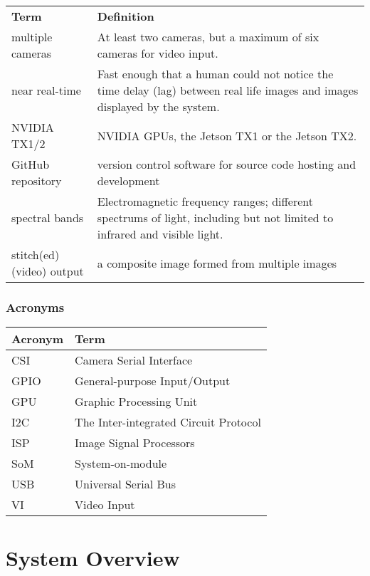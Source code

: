\documentclass[letterpaper,10pt,serif,draftclsnofoot,onecolumn,compsoc,titlepage]{IEEEtran}
\begin{document}
\begin{tabular}{|l|p{11cm}|}
	\hline
	\textbf{Term} & \textbf{Definition}\\
	multiple cameras & At least two cameras, but a maximum of six cameras for 
	video input.\\
	\hline
	near real-time & Fast enough that a human could not notice the time 
	delay (lag) between \newline real life images and images displayed by the system.\\
	\hline
	NVIDIA TX1/2 & NVIDIA GPUs, the Jetson TX1 or the Jetson TX2.\\
	\hline
	GitHub repository & version control software for source code hosting and development\\
	\hline
	spectral bands & Electromagnetic frequency ranges; different 
	spectrums of light, including \newline but not limited to infrared 
	and visible light.\\
	\hline
	stitch(ed) (video) output & a composite image formed from multiple images\\
	\hline
\end{tabular}

\subsubsection{Acronyms}

\begin{tabular}{|l|l|}
	\hline
	\textbf{Acronym} & \textbf{Term}\\
	\hline
	CSI & Camera Serial Interface\\
	\hline
	GPIO & General-purpose Input/Output\\
	\hline
	GPU & Graphic Processing Unit\\
	\hline
	I2C & The Inter-integrated Circuit Protocol\\
	\hline
	ISP & Image Signal Processors\\
	\hline
	SoM & System-on-module\\
	\hline
	USB & Universal Serial Bus\\
	\hline
	VI & Video Input\\
	\hline
\end{tabular}

\newpage
\section{System Overview}  
\end{document}
